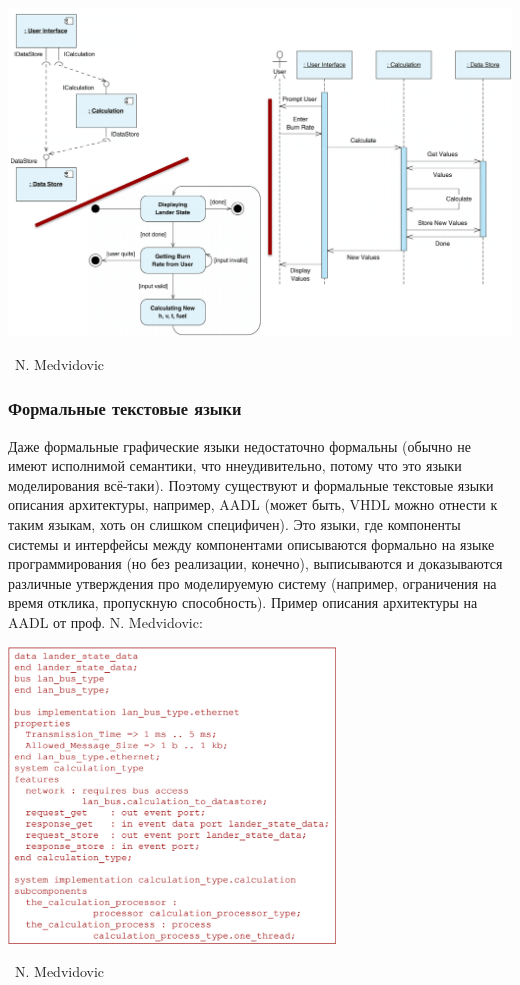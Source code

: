 \documentclass[a5paper]{article}
\newcommand{\attribution}[1] {
	\vspace{-5mm}\begin{flushright}\begin{scriptsize}%
	{\textcopyright\, #1}\end{scriptsize}\end{flushright}
}
\begin{document}
\begin{center}
	\includegraphics[width=\textwidth]{uml.png}
	\attribution{N. Medvidovic}
\end{center}

\subsubsection{Формальные текстовые языки}

Даже формальные графические языки недостаточно формальны (обычно не имеют исполнимой семантики, что ннеудивительно, потому что это языки моделирования всё-таки). Поэтому существуют и формальные текстовые языки описания архитектуры, например, AADL (может быть, VHDL можно отнести к таким языкам, хоть он слишком специфичен). Это языки, где компоненты системы и интерфейсы между компонентами описываются формально на языке программирования (но без реализации, конечно), выписываются и доказываются различные утверждения про моделируемую систему (например, ограничения на время отклика, пропускную способность). Пример описания архитектуры на AADL от проф. N. Medvidovic:

\begin{center}
	\includegraphics[width=0.65\textwidth]{aadl.png}
	\attribution{N. Medvidovic}
\end{center}
\end{document}
